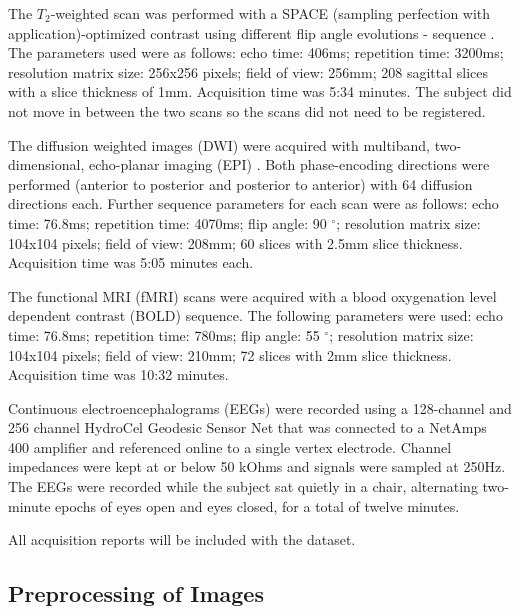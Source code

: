 The $T_2$-weighted scan was performed with a SPACE (sampling perfection with application)-optimized contrast using different flip angle evolutions - sequence \cite{ref:space}. The parameters used were as follows: echo time: 406ms; repetition time: 3200ms; resolution matrix size: 256x256 pixels; field of view: 256mm; 208 sagittal slices with a slice thickness of 1mm. Acquisition time was 5:34 minutes. The subject did not move in between the two scans so the scans did not need to be registered.

The diffusion weighted images (DWI) were acquired with multiband, two-dimensional, echo-planar imaging (EPI) \cite{ref:epi}. Both phase-encoding directions were performed (anterior to posterior and posterior to anterior) with 64 diffusion directions each. Further sequence parameters for each scan were as follows: echo time: 76.8ms; repetition time: 4070ms; flip angle: 90 $^{\circ}$; resolution matrix size: 104x104 pixels; field of view: 208mm; 60 slices with 2.5mm slice thickness. Acquisition time was 5:05 minutes each.

The functional MRI (fMRI) scans were acquired with a blood oxygenation level dependent contrast (BOLD) sequence. The following parameters were used: echo time: 76.8ms; repetition time: 780ms; flip angle: 55 $^{\circ}$; resolution matrix size: 104x104 pixels; field of view: 210mm; 72 slices with 2mm slice thickness. Acquisition time was 10:32 minutes.

Continuous electroencephalograms (EEGs) were recorded using a 128-channel and 256 channel HydroCel Geodesic Sensor Net that was connected to a NetAmps 400 amplifier and referenced online to a single vertex electrode. Channel impedances were kept at or below 50 kOhms and signals were sampled at 250Hz. The EEGs were recorded while the subject sat quietly in a chair, alternating two-minute epochs of eyes open and eyes closed, for a total of twelve minutes.

All acquisition reports will be included with the dataset.

\subsection{Preprocessing of Images}
\label{sec:preprocess}

